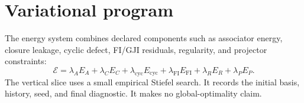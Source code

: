 \section{Variational program}

The energy system combines declared components such as associator energy, closure leakage, cyclic defect, FI/GJI residuals, regularity, and projector constraints:
\[
\mathcal E=\lambda_AE_A+\lambda_CE_C+\lambda_{\mathrm{cyc}}E_{\mathrm{cyc}}+\lambda_{\mathrm{FI}}E_{\mathrm{FI}}+\lambda_RE_R+\lambda_PE_P.
\]
The vertical slice uses a small empirical Stiefel search. It records the initial basis, history, seed, and final diagnostic. It makes no global-optimality claim.

